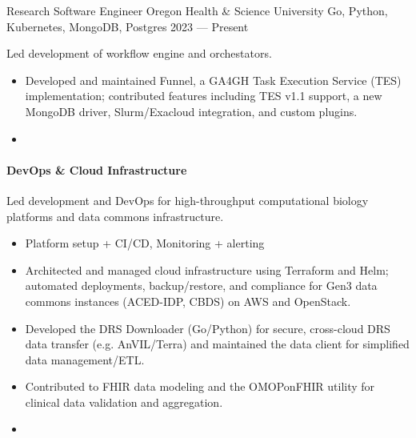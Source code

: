 \showoff
{Research Software Engineer}
{Oregon Health \& Science University}
{Go, Python, Kubernetes, MongoDB, Postgres}
{2023 --- Present}

Led development of workflow engine and orchestators.

\begin{itemize}[label=$\triangleright$, leftmargin=*]
    \item Developed and maintained Funnel, a GA4GH Task Execution Service (TES) implementation; contributed features including TES v1.1 support, a new MongoDB driver, Slurm/Exacloud integration, and custom plugins.
    \item {}
\end{itemize}

\paragraph{DevOps \& Cloud Infrastructure}

Led development and DevOps for high-throughput computational biology platforms and data commons infrastructure.

\begin{itemize}[label=$\triangleright$]
    \item Platform setup + CI/CD, Monitoring + alerting
    \item Architected and managed cloud infrastructure using Terraform and Helm; automated deployments, backup/restore, and compliance for Gen3 data commons instances (ACED-IDP, CBDS) on AWS and OpenStack.
    \item Developed the DRS Downloader (Go/Python) for secure, cross-cloud DRS data transfer (e.g. AnVIL/Terra) and maintained the data client for simplified data management/ETL.
    \item Contributed to FHIR data modeling and the OMOPonFHIR utility for clinical data validation and aggregation.
    \item {}
\end{itemize}
